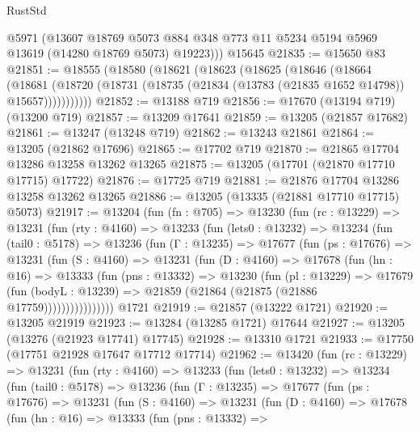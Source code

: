 \begin{lexlean}{RustStd}
\begin{coremodule}
        @5971
        (@13607
          @18769
          @5073
          @884
          @348
          @773
          @11
          @5234
          @5194
          @5969
          @13619
          (@14280 @18769 @5073)
          @19223)))
    @15645
@21835 := @15650 @83
@21851 := @18555
    (@18580
      (@18621
        (@18623
          (@18625
            (@18646
              (@18664
                (@18681
                  (@18720 (@18731 (@18735 (@21834 (@13783 (@21835 @1652 @14798)) @15657)))))))))))
@21852 := @13188 @719
@21856 := @17670 (@13194 @719) (@13200 @719)
@21857 := @13209 @17641
@21859 := @13205 (@21857 @17682)
@21861 := @13247 (@13248 @719)
@21862 := @13243 @21861
@21864 := @13205 (@21862 @17696)
@21865 := @17702 @719
@21870 := @21865 @17704 @13286 @13258 @13262 @13265
@21875 := @13205 (@17701 (@21870 @17710 @17715) @17722)
@21876 := @17725 @719
@21881 := @21876 @17704 @13286 @13258 @13262 @13265
@21886 := @13205 (@13335 (@21881 @17710 @17715) @5073)
@21917 := @13204
    (fun (fn : @705) =>
    @13230
      (fun (rc : @13229) =>
      @13231
        (fun (rty : @4160) =>
        @13233
          (fun (lets0 : @13232) =>
          @13234
            (fun (tail0 : @5178) =>
            @13236
              (fun (Γ : @13235) =>
              @17677
                (fun (ps : @17676) =>
                @13231
                  (fun (S : @4160) =>
                  @13231
                    (fun (D : @4160) =>
                    @17678
                      (fun (hn : @16) =>
                      @13333
                        (fun (pns : @13332) =>
                        @13230
                          (fun (pl : @13229) =>
                          @17679
                            (fun (bodyL : @13239) =>
                            @21859 (@21864 (@21875 (@21886 @17759))))))))))))))))
    @1721
@21919 := @21857 (@13222 @1721)
@21920 := @13205 @21919
@21923 := @13284 (@13285 @1721) @17644
@21927 := @13205 (@13276 (@21923 @17741) @17745)
@21928 := @13310 @1721
@21933 := @17750 (@17751 @21928 @17647 @17712 @17714)
@21962 := @13420
    (fun (rc : @13229) =>
    @13231
      (fun (rty : @4160) =>
      @13233
        (fun (lets0 : @13232) =>
        @13234
          (fun (tail0 : @5178) =>
          @13236
            (fun (Γ : @13235) =>
            @17677
              (fun (ps : @17676) =>
              @13231
                (fun (S : @4160) =>
                @13231
                  (fun (D : @4160) =>
                  @17678
                    (fun (hn : @16) =>
                    @13333
                      (fun (pns : @13332) =>

\end{coremodule}
\end{lexlean}
